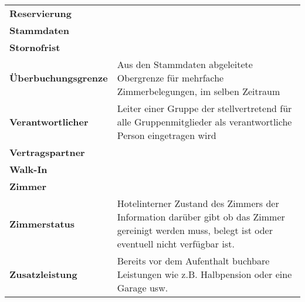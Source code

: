 \documentclass[../Pflichtenheft.tex]{subfiles}
\begin{document}
\begin{longtable}{p{5cm} p{10cm}}
        \textbf{Reservierung} & \\[0.5cm]
        \textbf{Stammdaten} & \\[0.5cm]
        \textbf{Stornofrist} & \\[0.5cm]
        \textbf{Überbuchungsgrenze} & Aus den Stammdaten abgeleitete Obergrenze für mehrfache Zimmerbelegungen, im selben Zeitraum \\[0.5cm]
        \textbf{Verantwortlicher} & Leiter einer Gruppe der stellvertretend für alle Gruppenmitglieder als verantwortliche Person eingetragen wird \\[0.5cm]
        \textbf{Vertragspartner} & \\[0.5cm]
        \textbf{Walk-In} & \\[0.5cm]
        \textbf{Zimmer} & \\[0.5cm]
        \textbf{Zimmerstatus} & Hotelinterner Zustand des Zimmers der Information darüber gibt ob das Zimmer gereinigt werden muss, belegt ist oder eventuell nicht verfügbar ist. \\[0.5cm]
        \textbf{Zusatzleistung} & Bereits vor dem Aufenthalt buchbare Leistungen wie z.B. Halbpension oder eine Garage usw.\\[0.5cm]
    \end{longtable}
\end{document}
